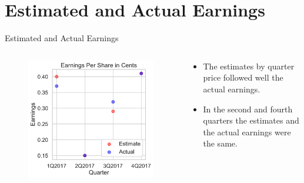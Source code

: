 \documentclass{beamer}
\begin{document}
\section{Estimated and Actual Earnings}
\begin{frame}{Estimated and Actual Earnings}
	\begin{columns}[c]
		\begin{column}{0.6\textwidth}
			\begin{figure}
				\centering
				\includegraphics[width=\textwidth]{2-estimitate_and_actual_earnings.pdf}
			\end{figure}
		\end{column}
		\begin{column}{0.5\textwidth}
			\begin{itemize}
				\item The estimates by quarter price followed well the actual earnings.
				\item In the second and fourth quarters the estimates and the actual earnings were the same.
			\end{itemize}
		\end{column}
	\end{columns}
\end{frame}
\end{document}

